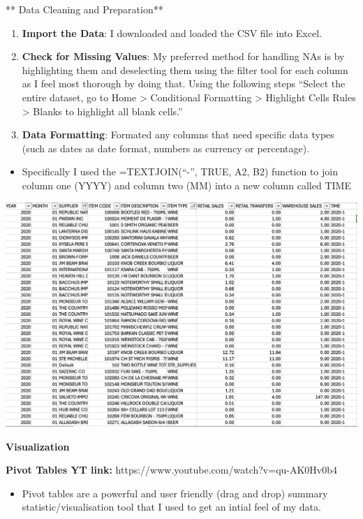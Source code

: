 \documentclass[
  letterpaper,
  DIV=11,
  numbers=noendperiod]{scrreprt}
\providecommand{\tightlist}{%
  \setlength{\itemsep}{0pt}\setlength{\parskip}{0pt}}\usepackage{longtable,booktabs,array}
\begin{document}
** Data Cleaning and Preparation**

\begin{enumerate}
\def\labelenumi{\arabic{enumi}.}
\tightlist
\item
  \textbf{Import the Data}: I downloaded and loaded the CSV file into
  Excel.
\item
  \textbf{Check for Missing Values}: My preferred method for handling
  NAs is by highlighting them and deselecting them using the filter tool
  for each column as I feel most thorough by doing that. Using the
  following steps ``Select the entire dataset, go to Home \textgreater{}
  Conditional Formatting \textgreater{} Highlight Cells Rules
  \textgreater{} Blanks to highlight all blank cells.''
\item
  \textbf{Data Formatting}: Formated any columns that need specific data
  types (such as dates as date format, numbers as currency or
  percentage).
\end{enumerate}

\begin{itemize}
\tightlist
\item
  Specifically I used the =TEXTJOIN(``-'', TRUE, A2, B2) function to
  join column one (YYYY) and column two (MM) into a new column called
  TIME
\end{itemize}

\includegraphics{summary_screenshot.png}

\textbf{Visualization}

\textbf{Pivot Tables YT link:}
https://www.youtube.com/watch?v=qu-AK0Hv0b4

\begin{itemize}
\tightlist
\item
  Pivot tables are a powerful and user friendly (drag and drop) summary
  statistic/visualisation tool that I used to get an intial feel of my
  data.
\end{itemize}
\end{document}
